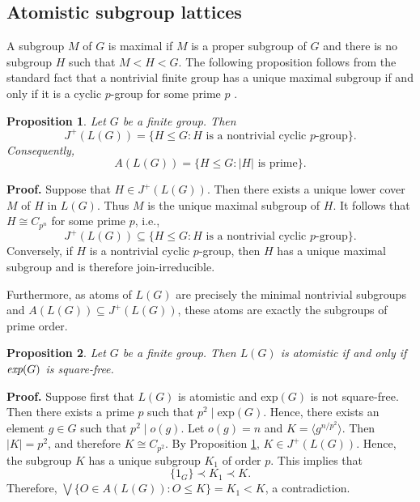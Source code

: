 \documentclass[12pt]{article}
\newtheorem{proposition}{\bf Proposition}[section]
\def\QEDopen{{\setlength{\fboxsep}{0pt}\setlength{\fboxrule}{0.2pt}\fbox{\rule[0pt]{0pt}{1.3ex}\rule[0pt]{1.3ex}{0pt}}}}
\def\QED{\QEDopen}
\def\proof{{\bf Proof.} }
\def\endproof{\hspace*{\fill}~\QED\par\endtrivlist\unskip}
\begin{document}
\subsection{Atomistic subgroup lattices}
A subgroup $M$ of $G$ is maximal if $M$ is a proper subgroup of $G$ and there is no subgroup $H$ such that $M<H<G$. The following proposition follows from the standard fact that a nontrivial finite group has a unique maximal subgroup if and only if it is a cyclic $p$-group for some prime $p$ \cite{Rotman}.
\begin{proposition}\label{P02}
Let $G$ be a finite group. Then $$J^{+}(L(G))=\{H\leq G: H \mbox{ is a nontrivial cyclic } p\mbox{-group}\}.$$  
Consequently, $$A(L(G))=\{H\leq G: |H| \mbox{ is prime}\}.$$
\end{proposition}
\proof
Suppose that $H\in J^{+}(L(G))$. Then there exists a unique 
lower cover $M$ of $H$ in $L(G)$. Thus $M$ is the unique maximal 
subgroup of $H$. It follows that $H\cong C_{p^n}$ for some prime $p$, i.e., $$J^{+}(L(G))\subseteq\{H\leq G: H \mbox{ is a nontrivial cyclic } p\mbox{-group}\}. $$
Conversely, if $H$ is a nontrivial cyclic $p$-group, then $H$ has 
a unique maximal subgroup and is therefore join-irreducible. 

Furthermore, as atoms of $L(G)$ are precisely the minimal nontrivial 
subgroups and $A(L(G))\subseteq J^{+}(L(G))$, 
these atoms are exactly the subgroups of prime order.
\endproof

\begin{proposition}\label{P03}
Let $G$ be a finite group. Then $L(G)$ is atomistic if and only if $\emph{exp}(G)$ is square-free.   
\end{proposition}
\proof
Suppose first that $L(G)$ is atomistic and $\mbox{exp}(G)$ is not square-free. 
Then there exists a prime $p$ such that $p^2\mid \mbox{exp}(G)$. 
Hence, there exists an element $g\in G$ such that $p^2\mid o(g)$. 
Let $o(g)=n$ and $K=\langle g^{n/p^2}\rangle$.
Then $|K|=p^2$, and therefore $K\cong C_{p^2}$. 
By Proposition \ref{P02}, $K\in J^{+}(L(G))$. 
Hence, the subgroup $K$ has a unique 
subgroup $K_1$ of order $p$. This implies that  
$$\{1_G\}\prec K_1\prec K.$$
Therefore, $\bigvee \{O\in A(L(G)): O\leq K\}=K_1<K$, a contradiction.
\end{document}
